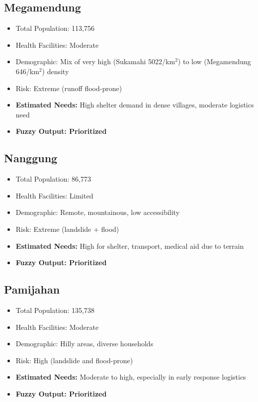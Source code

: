 \documentclass[journal,final,a4paper,twoside,11pt]{IEEEtran}
\begin{document}
\subsection*{Megamendung}
\begin{itemize}
    \item Total Population: 113,756
    \item Health Facilities: Moderate
    \item Demographic: Mix of very high (Sukamahi 5022/km$^2$) to low (Megamendung 646/km$^2$) density
    \item Risk: Extreme (runoff flood-prone)
    \item \textbf{Estimated Needs:} High shelter demand in dense villages, moderate logistics need
    \item \textbf{Fuzzy Output: Prioritized}
\end{itemize}

\subsection*{Nanggung}
\begin{itemize}
    \item Total Population: 86,773
    \item Health Facilities: Limited
    \item Demographic: Remote, mountainous, low accessibility
    \item Risk: Extreme (landslide + flood)
    \item \textbf{Estimated Needs:} High for shelter, transport, medical aid due to terrain
    \item \textbf{Fuzzy Output: Prioritized}
\end{itemize}

\subsection*{Pamijahan}
\begin{itemize}
    \item Total Population: 135,738
    \item Health Facilities: Moderate
    \item Demographic: Hilly areas, diverse households
    \item Risk: High (landslide and flood-prone)
    \item \textbf{Estimated Needs:} Moderate to high, especially in early response logistics
    \item \textbf{Fuzzy Output: Prioritized}
\end{itemize}
\end{document}
